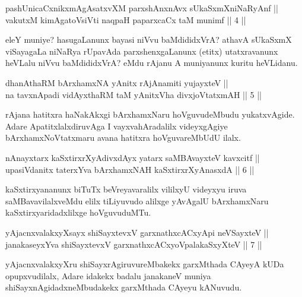 \begin{shl}
pashUnicaCxnikxmAgAsatxvXM parxshAnxnAvx sUkaSxmXniNaRyAnf || \\
vakutxM kimAgatoV\s siVti naqpaH paparxcaCx taM munimf \hfill ||  4 ||  
\end{shl}

\begin{artha}
eleY muniye? hasugaLanunx bayasi niVvu baMdididxVrA? athavA sUkaSxmX viSayagaLa niNaRya rUpavAda parxshenxgaLanunx (etitx) utatxravanunx heVLalu niVvu baMdididxVrA? eMdu rAjanu A muniyanunx kuritu heVLidanu.
\end{artha}


\begin{shl}
dhanAthaRM bArxhamxNA yAnitx rAjAnamiti yujayxteV || \\
na tavxnApadi vidAyxthaRM taM yAnitxVha divxjoVtatxmAH \hfill ||  5 ||  
\end{shl}

\begin{artha}
rAjana hatitxra haNakAkxgi bArxhamxNaru hoVguvudeMbudu yukatxvAgide. Adare ApatitxlalxdiruvAga I vayxvahAradalilx videyxgAgiye bArxhamxNoVtatxmaru avana hatitxra hoVguvareMbUdU ilalx.
\end{artha}

\begin{shl}
nAnayxtarx kaSxtirxrXyAdivxdAyx yatarx saMBAvayxteV kavxcitf || \\
upasiVdanitx taterxYva bArxhamxNAH kaSxtirxrXyAnasxdA \hfill ||  6 ||  
\end{shl}

\begin{artha}
kaSxtirxyananunx biTuTx beVreyavaralilx vililxyU videyxyu iruva saMBavavilalxveMdu elilx tiLiyuvudo alilxge yAvAgalU bArxhamxNaru kaSxtirxyaridadxlilxge hoVguvuduMTu.
\end{artha}


\begin{shl}
yAjacnxvalakxyXsayx shiSayxtevxV garxnathxcACxyA\s pi neVSayxteV || \\
janakaseyxYva shiSayxtevxV garxnathxcACxyoVpalakaSxyXteV \hfill ||  7 ||  
\end{shl}

\begin{artha}
yAjacnxvalakxyXru shiSayxrAgiruvureMbakekx garxMthada CAyeyA kUDa opupxvudilalx, Adare idakekx badalu janakaneV muniya shiSayxnAgidadxneMbudakekx garxMthada CAyeyu kANuvudu.
\end{artha}

